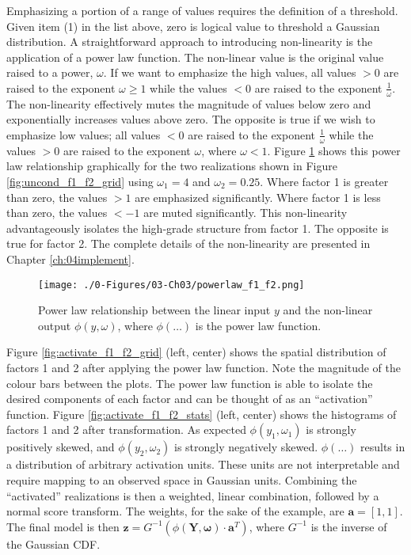 Emphasizing a portion of a range of values requires the definition of a threshold. Given item (1) in the list above, zero is logical value to threshold a Gaussian distribution. A straightforward approach to introducing non-linearity is the application of a power law function. The non-linear value is the original value raised to a power, $\omega$. If we want to emphasize the high values, all values $> 0$ are raised to the exponent $\omega \geq 1$ while the values $< 0$ are raised to the exponent $\frac{1}{\omega}$. The non-linearity effectively mutes the magnitude of values below zero and exponentially increases values above zero. The opposite is true if we wish to emphasize low values; all values $< 0$ are raised to the exponent $\frac{1}{\omega}$ while the values $> 0$ are raised to the exponent $\omega$, where $\omega < 1$. Figure \ref{fig:powerlaw_f1_f2} shows this power law relationship graphically for the two realizations shown in Figure \ref{fig:uncond_f1_f2_grid} using $\omega_{1}=4$ and $\omega_{2}=0.25$. Where factor 1 is greater than zero, the values $> 1$ are emphasized significantly. Where factor 1 is less than zero, the values $< -1$ are muted significantly. This non-linearity advantageously isolates the high-grade structure from factor 1. The opposite is true for factor 2. The complete details of the non-linearity are presented in Chapter \ref{ch:04implement}.

\begin{figure}[htb!]
    \centering
    \texttt{[image: ./0-Figures/03-Ch03/powerlaw\_f1\_f2.png]}
    \caption{Power law relationship between the linear input $y$ and the non-linear output $\phi(y, \omega)$, where $\phi(\dots)$ is the power law function. }
    \label{fig:powerlaw_f1_f2}
\end{figure}

Figure \ref{fig:activate_f1_f2_grid} (left, center) shows the spatial distribution of factors 1 and 2 after applying the power law function. Note the magnitude of the colour bars between the plots. The power law function is able to isolate the desired components of each factor and can be thought of as an ``activation'' function. Figure \ref{fig:activate_f1_f2_stats} (left, center) shows the histograms of factors 1 and 2 after transformation. As expected $\phi(y_{1}, \omega_{1})$ is strongly positively skewed, and $\phi(y_{2}, \omega_{2})$ is strongly negatively skewed. $\phi(\dots)$ results in a distribution of arbitrary activation units. These units are not interpretable and require mapping to an observed space in Gaussian units. Combining the ``activated'' realizations is then a weighted, linear combination, followed by a normal score transform. The weights, for the sake of the example, are $\mathbf{a} = [1,1]$. The final model is then $\mathbf{z} = G^{-1}(\phi(\mathbf{Y}, \boldsymbol{\omega}) \cdot \mathbf{a}^{T})$, where $G^{-1}$ is the inverse of the Gaussian \gls{CDF}.

